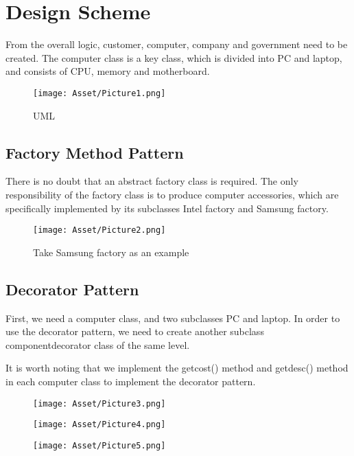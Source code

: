 \documentclass{article}
\begin{document}
\section{Design Scheme}
    From the overall logic, customer, computer, company and government need to be created. The computer class is a key class, which is divided into PC and laptop, and consists of CPU, memory and motherboard.
    
\begin{figure}
\centering
\texttt{[image: Asset/Picture1.png]}
\caption{UML}
\end{figure}    

\subsection{Factory Method Pattern}
    There is no doubt that an abstract factory class is required. The only responsibility of the factory class is to produce computer accessories, which are specifically implemented by its subclasses Intel factory and Samsung factory.
    
\begin{figure}
\centering
\texttt{[image: Asset/Picture2.png]}
\caption{Take Samsung factory as an example}
\end{figure}    

\subsection{Decorator Pattern}
    First, we need a computer class, and two subclasses PC and laptop. In order to use the decorator pattern, we need to create another subclass componentdecorator class of the same level.

    It is worth noting that we implement the getcost() method and getdesc() method in each computer class to implement the decorator pattern.
    
\begin{figure}
\centering
\texttt{[image: Asset/Picture3.png]}
\end{figure}    
\begin{figure}
\centering
\texttt{[image: Asset/Picture4.png]}
\end{figure}    
\begin{figure}
\centering
\texttt{[image: Asset/Picture5.png]}
\end{figure}    
\end{document}
